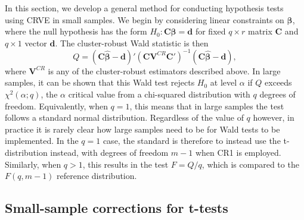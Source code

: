 \documentclass[12pt]{article}
\newcommand{\bm}{\mathbf}
\newcommand{\bs}{\boldsymbol}
\begin{document}
In this section, we develop a general method for conducting hypothesis tests using CRVE in small samples. We begin by considering linear constraints on $\bs\beta$, where the null hypothesis has the form $H_0: \bm{C}\bs\beta = \bm{d}$ for fixed $q \times r$ matrix $\bm{C}$ and $q \times 1$ vector $\bm{d}$. 
The cluster-robust Wald statistic is then
\begin{equation}
\label{eq:Wald_stat}
Q = \left(\bm{C}\bs{\hat\beta} - \bm{d}\right)'\left(\bm{C} \bm{V}^{CR} \bm{C}'\right)^{-1}\left(\bm{C}\bs{\hat\beta} - \bm{d}\right),
\end{equation}
where $\bm{V}^{CR}$ is any of the cluster-robust estimators described above.
In large samples, it can be shown that this Wald test rejects $H_0$ at level $\alpha$ if $Q$ exceeds $\chi^2(\alpha; q)$, the $\alpha$ critical value from a chi-squared distribution with $q$ degrees of freedom. 
Equivalently, when $q = 1$, this means that in large samples the test follows a standard normal distribution. 
Regardless of the value of $q$ however, in practice it is rarely clear how large samples need to be for Wald tests to be implemented.
In the $q = 1$ case, the standard is therefore to instead use the t-distribution instead, with degrees of freedom $m - 1$ when CR1 is employed.
Similarly, when $q > 1$, this results in the test $F = Q/q$, which is compared to the $F(q, m - 1)$ reference distribution.


\subsection{Small-sample corrections for t-tests}
 
\end{document}
